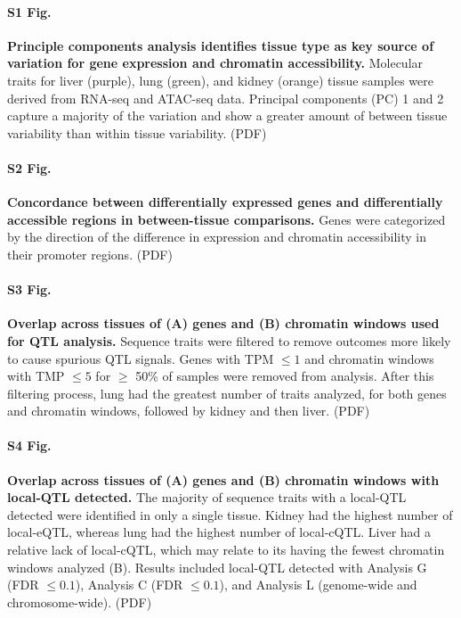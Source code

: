 \documentclass[10pt,letterpaper]{article}
\begin{document}
\paragraph*{S1 Fig.}
\label{S_pca}
{\bf Principle components analysis identifies tissue type as key source of variation for gene expression and chromatin accessibility.} 
Molecular traits for liver (purple), lung (green), and kidney (orange) tissue samples were derived from RNA-seq and ATAC-seq data. Principal components (PC) 1 and 2 capture a majority of the variation and show a greater amount of between tissue variability than within tissue variability. (PDF)

\paragraph*{S2 Fig.}
\label{S_de_concordance}
{\bf Concordance between differentially expressed genes and differentially accessible regions in between-tissue comparisons.} 
Genes were categorized by the direction of the difference in expression and chromatin accessibility in their promoter regions. (PDF)

\paragraph*{S3 Fig.}
\label{S_upset_outcomes}
{\bf Overlap across tissues of (A) genes and (B) chromatin windows used for QTL analysis.} 
Sequence traits were filtered to remove outcomes more likely to cause spurious QTL signals. Genes with TPM $\le 1$ and chromatin windows with TMP $\le 5$ for $\ge$ 50\% of samples were removed from analysis. After this filtering process, lung had the greatest number of traits analyzed, for both genes and chromatin windows, followed by kidney and then liver. (PDF)

\paragraph*{S4 Fig.}
\label{S_upset_qtl}
{\bf Overlap across tissues of (A) genes and (B) chromatin windows with local-QTL detected.} 
The majority of sequence traits with a local-QTL detected were identified in only a single tissue. Kidney had the highest number of local-eQTL, whereas lung had the highest number of local-cQTL. Liver had a relative lack of local-cQTL, which may relate to its having the fewest chromatin windows analyzed (B). Results included local-QTL detected with Analysis G (FDR $\le 0.1$), Analysis C (FDR $\le 0.1$), and Analysis L (genome-wide and chromosome-wide). (PDF)
\end{document}
